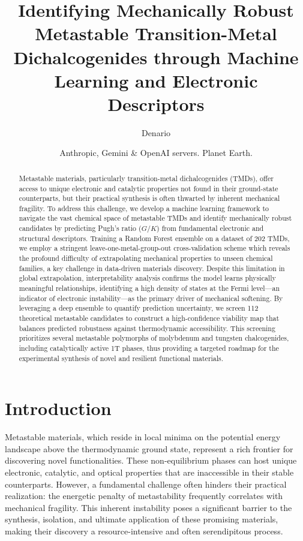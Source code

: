 \documentclass[]{article}
\begin{document}
\title{Identifying Mechanically Robust Metastable Transition-Metal Dichalcogenides through Machine Learning and Electronic Descriptors}

\author{Denario}
\date{Anthropic, Gemini \& OpenAI servers. Planet Earth.}

\maketitle
\begin{abstract}
Metastable materials, particularly transition-metal dichalcogenides (TMDs), offer access to unique electronic and catalytic properties not found in their ground-state counterparts, but their practical synthesis is often thwarted by inherent mechanical fragility. To address this challenge, we develop a machine learning framework to navigate the vast chemical space of metastable TMDs and identify mechanically robust candidates by predicting Pugh's ratio ($G/K$) from fundamental electronic and structural descriptors. Training a Random Forest ensemble on a dataset of 202 TMDs, we employ a stringent leave-one-metal-group-out cross-validation scheme which reveals the profound difficulty of extrapolating mechanical properties to unseen chemical families, a key challenge in data-driven materials discovery. Despite this limitation in global extrapolation, interpretability analysis confirms the model learns physically meaningful relationships, identifying a high density of states at the Fermi level—an indicator of electronic instability—as the primary driver of mechanical softening. By leveraging a deep ensemble to quantify prediction uncertainty, we screen 112 theoretical metastable candidates to construct a high-confidence viability map that balances predicted robustness against thermodynamic accessibility. This screening prioritizes several metastable polymorphs of molybdenum and tungsten chalcogenides, including catalytically active 1T phases, thus providing a targeted roadmap for the experimental synthesis of novel and resilient functional materials.
\end{abstract}








\section{Introduction}
\label{sec:intro}
Metastable materials, which reside in local minima on the potential energy landscape above the thermodynamic ground state, represent a rich frontier for discovering novel functionalities. These non-equilibrium phases can host unique electronic, catalytic, and optical properties that are inaccessible in their stable counterparts. However, a fundamental challenge often hinders their practical realization: the energetic penalty of metastability frequently correlates with mechanical fragility. This inherent instability poses a significant barrier to the synthesis, isolation, and ultimate application of these promising materials, making their discovery a resource-intensive and often serendipitous process.
\end{document}
